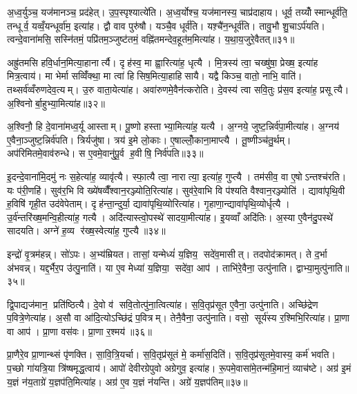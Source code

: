 अ॒ध्व॒र्युञ्च॒ यज॑मानञ्च॒ प्रद॑हेत्। उ॒प॒स्पृश्यात्ये॑ति। अ॒ध्व॒र्योश्च॒ यज॑मानस्य॒ चाप्र॑दाहाय। धूर्व॒ तय्योँस्मान्धूर्व॑ति॒ तन्धूर्व॒ यव्वँ॒यन्धूर्वा॑म॒ इत्या॑ह। द्वौ वाव पुरु॑षौ। यञ्चै॒व धूर्व॑ति। यश़्चै॑न॒न्धूर्व॑ति। तावु॒भौ शु॒चाऽर्प॑यति। त्वन्दे॒वाना॑मसि॒ सस्नि॑तमं॒ पप्रि॑तम॒ञ्जुष्ट॑तमं॒ वह्नि॑तमन्देव॒हूत॑म॒मित्या॑ह। य॒था॒य॒जुरे॒वैतत्॥३१॥

अह्रु॑तमसि हवि॒र्धान॒मित्या॒हानार्त्यै। दृह॑स्व॒ मा ह्वा॒रित्या॑ह॒ धृत्यै। मि॒त्रस्य॑ त्वा॒ चख्षु॑षा॒ प्रेख्ष॒ इत्या॑ह मित्र॒त्वाय॑। मा भेर्मा सव्विँ॑क्था॒ मा त्वा॑ हिसिष॒मित्या॒हाहिसायै। यद्वै किञ्च॒ वातो॒ नाभि॒ वाति॑। तथ्सर्व॑व्वँरुणदेव॒त्यम्। उ॒रु वाता॒येत्या॑ह। अवा॑रुणमे॒वैन॑त्करोति। दे॒वस्य॑ त्वा सवि॒तुः प्र॑स॒व इत्या॑ह॒ प्रसूत्यै। अ॒श्विनोर्बा॒हुभ्या॒मित्या॑ह॥३२॥

अ॒श्विनौ॒ हि दे॒वाना॑मध्व॒र्यू आस्ताम्। पू॒ष्णो हस्ताभ्या॒मित्या॑ह॒ यत्यै। अ॒ग्नये॒ जुष्ट॒न्निर्व॑पा॒मीत्या॑ह। अ॒ग्नय॑ ए॒वैना॒ञ्जुष्ट॒न्निर्व॑पति। त्रिर्यजु॑षा। त्रय॑ इ॒मे लो॒काः। ए॒षाल्लोँ॒काना॒माप्त्यै। तू॒ष्णीञ्च॑तु॒र्थम्। अप॑रिमितमे॒वाव॑रुन्धे। स ए॒वमे॒वानु॑पू॒र्व ह॒वीषि॒ निर्व॑पति॥३३॥

इ॒दन्दे॒वाना॑मि॒दमु॑ नः स॒हेत्या॑ह॒ व्यावृ॑त्यै। स्फा॒त्यै त्वा॒ नारात्या॒ इत्या॑ह॒ गुप्त्यै। तम॑सीव॒ वा ए॒षोऽन्तश्च॑रति। यः प॑री॒णहि॑। सुव॑र॒भि वि ख्ये॑षव्वैँश्वान॒रञ्ज्योति॒रित्या॑ह। सुव॑रे॒वाभि वि प॑श्यति वैश्वान॒रञ्ज्योति॑। द्यावा॑पृथि॒वी ह॒विषि॑ गृही॒त उद॑वेपेताम्। दृह॑न्ता॒न्दुर्या॒ द्यावा॑पृथि॒व्योरित्या॑ह। गृ॒हाणा॒न्द्यावा॑पृथि॒व्योर्धृत्यै। उ॒र्व॑न्तरि॑ख्ष॒मन्वि॒हीत्या॑ह॒ गत्यै। अदि॑त्यास्त्वो॒पस्थे॑ सादया॒मीत्या॑ह। इ॒यव्वाँ अदि॑तिः। अ॒स्या ए॒वैन॑दु॒पस्थे॑ सादयति। अग्ने॑ ह॒व्य र॑ख्ष॒स्वेत्या॑ह॒ गुप्त्यै॥३४॥\anuvakamend[य॒ज्ञो वा आपो॒ धाम॑ प्र॒णीय॒ प्रच॑रत्यती॒यादे॒तद्बा॒हुभ्या॒मित्या॑ह ह॒वीषि॒ निर्व॑पति॒ गत्यै॑ च॒त्वारि॑ च]

इन्द्रो॑ वृ॒त्रम॑हन्न्। सो॑ऽपः। अ॒भ्य॑म्रियत। तासां॒ यन्मेध्यं॑ य॒ज्ञिय॒ सदे॑व॒मासीत्। तदपोद॑क्रामत्। ते द॒र्भा अ॑भवन्न्। यद्द॒र्भैर॒प उ॑त्पु॒नाति॑। या ए॒व मेध्या॑ य॒ज्ञिया॒ सदे॑वा॒ आप॑। ताभि॑रे॒वैना॒ उत्पु॑नाति। द्वाभ्या॒मुत्पु॑नाति॥३५॥

द्वि॒पाद्यज॑मान॒ प्रति॑ष्ठित्यै। दे॒वो व॑ सवि॒तोत्पु॑ना॒त्वित्या॑ह। स॒वि॒तृप्र॑सूत ए॒वैना॒ उत्पु॑नाति। अच्छि॑द्रेण प॒वित्रे॒णेत्या॑ह। अ॒सौ वा आ॑दि॒त्योऽच्छि॑द्रं प॒वित्रम्। तेनै॒वैना॒ उत्पु॑नाति। वसो॒ सूर्य॑स्य र॒श्मिभि॒रित्या॑ह। प्रा॒णा वा आप॑। प्रा॒णा वस॑वः। प्रा॒णा र॒श्मय॑॥३६॥

प्रा॒णैरे॒व प्रा॒णान्थ्सं पृ॑णक्ति। सा॒वि॒त्रि॒यर्चा। स॒वि॒तृप्र॑सूतं मे॒ कर्मा॑स॒दिति॑। स॒वि॒तृप्र॑सूतमे॒वास्य॒ कर्म॑ भवति। प॒च्छो गा॑यत्रि॒या त्रि॑ष्षमृद्ध॒त्वाय॑। आपो॑ देवीरग्रेपुवो अग्रेगुव॒ इत्या॑ह। रू॒पमे॒वासा॑मे॒तन्म॑हि॒मानं॒ व्याच॑ष्टे। अग्र॑ इ॒मं य॒ज्ञं न॑य॒ताग्रे॑ य॒ज्ञप॑ति॒मित्या॑ह। अग्र॑ ए॒व य॒ज्ञं न॑यन्ति। अग्रे॑ य॒ज्ञप॑तिम्॥३७॥

